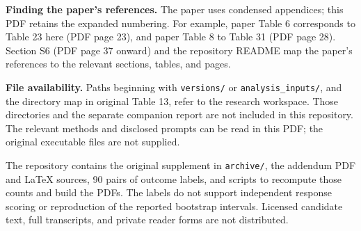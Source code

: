 \documentclass[11pt]{article}
\begin{document}
\textbf{Finding the paper's references.} The paper uses condensed appendices;
this PDF retains the expanded numbering. For example, paper Table 6 corresponds
to Table 23 here (PDF page 23), and paper Table 8 to Table 31 (PDF page 28).
Section S6 (PDF page 37 onward) and the repository README map the paper's
references to the relevant sections, tables, and pages.

\textbf{File availability.} Paths beginning with \texttt{versions/} or
\texttt{analysis\_inputs/}, and the directory map in original Table 13, refer to
the research workspace. Those directories and the separate companion report
are not included in this repository. The relevant methods and disclosed prompts
can be read in this PDF; the original executable files are not supplied.

The repository contains the original supplement in \texttt{archive/}, the
addendum PDF and LaTeX sources, 90 pairs of outcome labels, and scripts to
recompute those counts and build the PDFs. The labels do not support independent
response scoring or reproduction of the reported bootstrap intervals. Licensed
candidate text, full transcripts, and private reader forms are not distributed.
\end{document}
